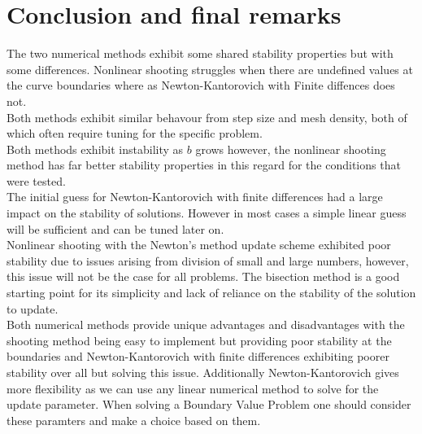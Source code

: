 \documentclass{article}
\begin{document}
\section{Conclusion and final remarks}
The two numerical methods exhibit some shared stability properties but with some differences. Nonlinear shooting struggles when there are undefined values at the curve boundaries where as Newton-Kantorovich with Finite diffences does not. \\
Both methods exhibit similar behavour from step size and mesh  density, both of which often require tuning for the specific problem. \\
Both methods exhibit instability as $b$ grows however, the nonlinear shooting method has far better stability properties in this regard for the conditions that were tested. \\
The initial guess for Newton-Kantorovich with finite differences had a large impact on the stability of solutions. However in most cases a simple linear guess will be sufficient and can be tuned later on. \\
Nonlinear shooting with the Newton's method update scheme exhibited poor stability due to issues arising from division of small and large numbers, however, this issue will not be the case for all problems. The bisection method is a good starting point for its simplicity and lack of reliance on the stability of the solution to update. \\
Both numerical methods provide unique advantages and disadvantages with the shooting method being easy to implement but providing poor stability at the boundaries and Newton-Kantorovich with finite differences exhibiting poorer stability over all but solving this issue. Additionally Newton-Kantorovich gives more flexibility as we can use any linear numerical method to solve for the update parameter. When solving a Boundary Value Problem one should consider these paramters and make a choice based on them. 
\end{document}
